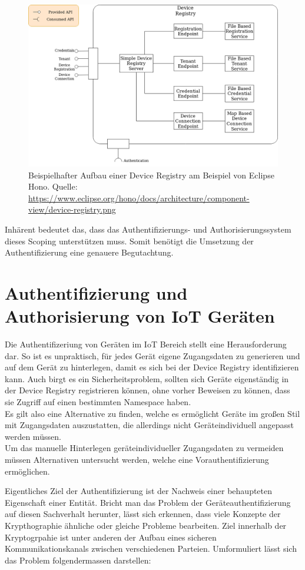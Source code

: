 \begin{figure}
    \centering
    \includegraphics[width=0.75\linewidth]{img/device-registry.png}
    \caption[Bestandteile einer Device Registry]{Beispielhafter Aufbau einer Device Registry am Beispiel von Eclipse Hono. Quelle: \url{https://www.eclipse.org/hono/docs/architecture/component-view/device-registry.png}}
    \label{fig:device_registry}
\end{figure}

Inhärent bedeutet das, dass das Authentifizierungs- und Authorisierungssystem dieses Scoping unterstützen muss. Somit benötigt die Umsetzung der Authentifizierung eine genauere Begutachtung.

\section{Authentifizierung und Authorisierung von IoT Geräten}
\label{sec:auth}

Die Authentifizeriung von Geräten im IoT Bereich stellt eine Herausforderung dar. So ist es unpraktisch, für jedes Gerät eigene Zugangsdaten zu generieren und auf dem Gerät zu hinterlegen, damit es sich bei der Device Registry identifizieren kann. Auch birgt es ein Sicherheitsproblem, sollten sich Geräte eigenständig in der Device Registry registrieren können, ohne vorher Beweisen zu können, dass sie Zugriff auf einen bestimmten Namespace haben. \\
Es gilt also eine Alternative zu finden, welche es ermöglicht Geräte im großen Stil mit Zugangsdaten auszustatten, die allerdings nicht Geräteindividuell angepasst werden müssen.\\
Um das manuelle Hinterlegen geräteindividueller Zugangsdaten zu vermeiden müssen Alternativen untersucht werden, welche eine Vorauthentifizierung ermöglichen. 

Eigentliches Ziel der Authentifizierung ist der Nachweis einer behaupteten Eigenschaft einer Entität. Bricht man das Problem der Geräteauthentifizierung auf diesen Sachverhalt herunter, lässt sich erkennen, dass viele Konzepte der Krypthographie ähnliche oder gleiche Probleme bearbeiten. Ziel innerhalb der Kryptogrpahie ist unter anderen der Aufbau eines sicheren Kommunikationskanals zwischen verschiedenen Parteien. Umformuliert lässt sich das Problem folgendermassen darstellen:

